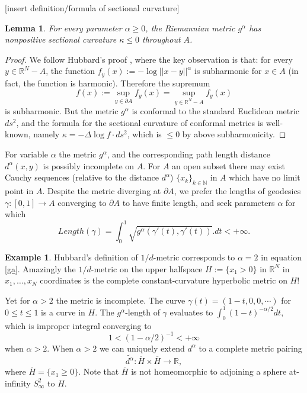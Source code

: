 \documentclass[12pt]{article}
\newtheorem{lem}[thm]{Lemma}
\theoremstyle{definition}
\newtheorem{exx}[thm]{Example}
\theoremstyle{remark}
\newcommand{\bR}{\mathbb{R}}
\newcommand{\bN}{\mathbb{N}}
\newcommand{\del}{\partial}
\begin{document}
[insert definition/formula of sectional curvature]  

\begin{lem}
For every parameter $\alpha \geq 0$, the Riemannian metric $g^\alpha$ has nonpositive sectional curvature $\kappa \leq 0$ throughout $A$. 
\end{lem}
\begin{proof}
We follow Hubbard's proof \cite[Thm. 2.2.9, pp.36]{hubbard}, where the key observation is that: for every $y\in \bR^N-A$, the function $f_y(x):=-\log||x-y||^{\alpha}$ is subharmonic for $x\in A$ (in fact, the function is harmonic). Therefore the supremum $$f(x):=\sup_{y\in \del A} f_y(x)=\sup_{y\in \bR^N-A} f_y(x)$$ is subharmonic. But the metric $g^\alpha$ is conformal to the standard Euclidean metric $ds^2$, and the formula for the sectional curvature of conformal metrics is well-known, namely $\kappa=-\Delta \log f \cdot ds^2$, which is $\leq 0$ by above subharmonicity.
\end{proof}



For variable $\alpha$ the metric $g^\alpha$, and the corresponding path length distance $d^\alpha(x,y)$ is possibly incomplete on $A$. For $A$ an open subset there may exist Cauchy sequences (relative to the distance $d^\alpha$) $\{x_k\}_{k\in \bN}$ in $A$ which have no limit point in $A$. Despite the metric diverging at $\del A$, we prefer the lengths of geodesics $\gamma:[0,1] \to A$ converging to $\del A$ to have finite length, and seek parameters $\alpha$ for which $$Length(\gamma)=\int_0^1 \sqrt{g^\alpha(\gamma'(t), \gamma'(t))}. dt <+\infty.$$ 


\begin{exx}
Hubbard's definition of $1/d$-metric corresponds to $\alpha=2$ in equation \eqref{ga}. Amazingly the $1/d$-metric on the upper halfspace $H:=\{x_1 > 0\}$ in $\bR^N$ in $x_1, \ldots, x_N$ coordinates is the complete constant-curvature hyperbolic metric on $H$! 

Yet for $\alpha>2$ the metric is incomplete. The curve $\gamma(t)=(1-t, 0, 0, \cdots)$ for $0\leq t \leq 1$ is a curve in $H$. The $g^\alpha$-length of $\gamma$ evaluates to $\int_0^1 (1-t)^{-\alpha/2}dt,$ which is improper integral converging to $$1<(1-\alpha/2)^{-1}<+\infty$$ when $\alpha>2$. When $\alpha>2$ we can uniquely extend $d^\alpha$ to a complete metric pairing $$\tilde{d^\alpha}: \overline{H} \times \overline{H} \to \bR,$$  where $\overline{H}=\{x_1\geq 0\}$. Note that $\overline{H}$ is not homeomorphic to adjoining a sphere at-infinity $S_\infty^2$ to $H$. 


\end{exx}
\end{document}
